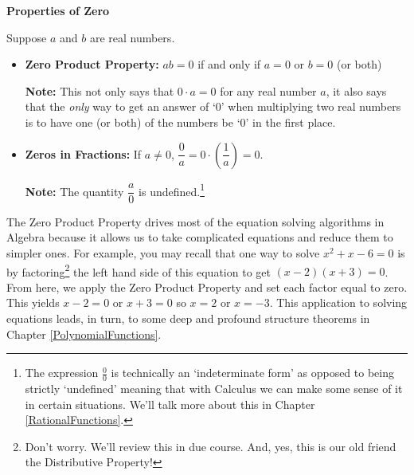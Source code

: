 \documentclass{ximera}
\begin{document}

\centerline{\textbf{Properties of Zero}}

Suppose $a$ and $b$ are real numbers.

\begin{itemize}

\item  \textbf{Zero Product Property:} $ab = 0$ if and only if $a=0$ or $b=0$ (or both)

\textbf{Note:} This not only says that $0 \cdot a = 0$ for any real number $a$, it also says that the \textit{only} way to get an answer of `$0$' when multiplying two real numbers  is to have one (or both) of the numbers be `$0$' in the first place.

\item  \textbf{Zeros in Fractions:}  If $a \neq 0$, $\dfrac{0}{a} = 0 \cdot \left(\dfrac{1}{a}\right) = 0$.

\textbf{Note:}  The quantity $\dfrac{a}{0}$ is undefined.\footnote{The expression $\frac{0}{0}$ is technically an `indeterminate form' as opposed to being strictly `undefined' meaning that with Calculus we can make some sense of it in certain situations.  We'll talk more about this in Chapter \ref{RationalFunctions}.}

\end{itemize}


\pagebreak

The Zero Product Property drives most of the equation solving algorithms in Algebra because it allows us to take complicated equations and reduce them to simpler ones.  For example, you may recall that one way to solve  $x^2+x-6=0$ is by factoring\footnote{Don't worry.  We'll review this in due course.  And, yes, this is our old friend the Distributive Property!} the left hand side of this equation to get  $(x-2)(x+3) = 0$.  From here, we apply the Zero Product Property and set each factor equal to zero.  This yields  $x-2=0$ or $x+3=0$ so $x=2$ or $x=-3$.  This application to solving equations leads, in turn,  to some deep and profound structure theorems in Chapter \ref{PolynomialFunctions}. 

\medskip
\end{document}
